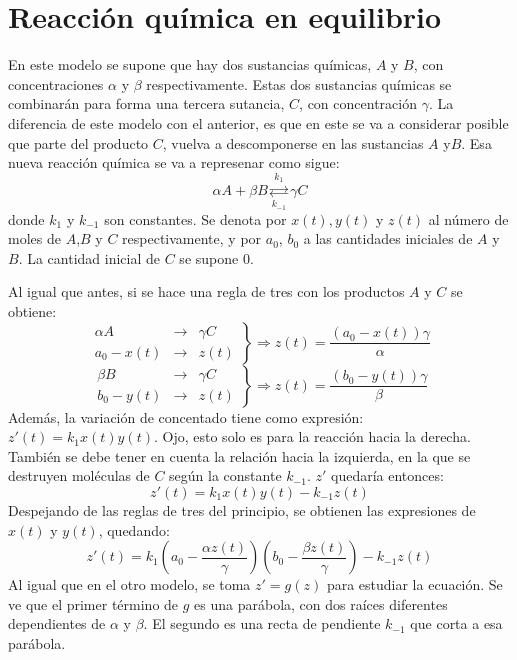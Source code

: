 \section{Reacción química en equilibrio}

En este modelo se supone que hay dos sustancias químicas, $A$ y $B$, con concentraciones $\alpha$ y $\beta$ respectivamente. Estas dos sustancias químicas se combinarán para forma una tercera sutancia, $C$, con concentración $\gamma$. La diferencia de este modelo con el anterior, es que en este se va a considerar posible que parte del producto $C$, vuelva a descomponerse en las sustancias $A$ y$B$. Esa nueva reacción química se va a represenar como sigue:
\[
\alpha A + \beta B \underset{k_{-1}}{\overset{k_1}{\rightleftarrows}} \gamma C
\]
donde $k_1$ y $k_{-1}$ son constantes. Se denota por $x(t),y(t)$ y $z(t)$  al número de moles de $A$,$B$ y $C$ respectivamente, y por $a_0$, $b_0$ a las cantidades iniciales de $A$ y $B$. La cantidad inicial de $C$ se supone 0.

Al igual que antes, si se hace una regla de tres con los productos $A$ y $C$ se obtiene:
\[
\left.
\begin{array}{ccc}
\alpha A & \longrightarrow & \gamma C\\
a_0-x(t) & \longrightarrow & z(t)
\end{array}
\right\} \Rightarrow z(t)=\frac{(a_0-x(t))\gamma}{\alpha}
\]
\[
\left.
\begin{array}{ccc}
\beta B & \longrightarrow & \gamma C\\
b_0-y(t) & \longrightarrow & z(t)
\end{array}
\right\} \Rightarrow z(t)=\frac{(b_0-y(t))\gamma}{\beta}
\]
Además, la variación de concentado tiene como expresión: $z'(t)=k_1x(t)y(t)$. Ojo, esto solo es para la reacción hacia la derecha. También se debe tener en cuenta la relación hacia la izquierda, en la que se destruyen moléculas de $C$ según la constante $k_{-1}$. $z'$ quedaría entonces:
\[
z'(t)=k_1x(t)y(t)-k_{-1}z(t)
\]
Despejando de las reglas de tres del principio, se obtienen las expresiones de $x(t)$ y $y(t)$, quedando:
\[
z'(t)=k_1\left(a_0-\frac{\alpha z(t)}{\gamma}\right)\left(b_0-\frac{\beta z(t)}{\gamma}\right)-k_ {-1}z(t)
\]
Al igual que en el otro modelo, se toma $z'=g(z)$ para estudiar la ecuación. Se ve que el primer término de $g$ es una parábola, con dos raíces diferentes dependientes de $\alpha$ y $\beta$. El segundo es una recta de pendiente $k_{-1}$ que corta a esa parábola.

